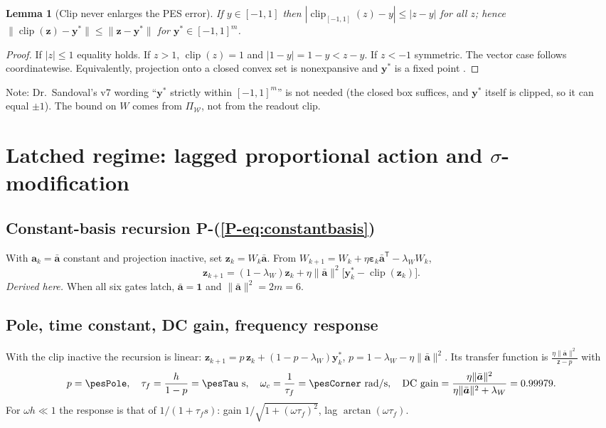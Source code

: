 \documentclass[11pt]{article}
\newcommand{\T}{^{\mathsf T}}
\newcommand{\clip}{\operatorname{clip}}
\newcommand{\PE}[1]{P-(\ref{P-#1})}          %
\newtheorem{lemma}{Lemma}
\theoremstyle{remark}
\begin{document}
\begin{lemma}[Clip never enlarges the PES error]\label{lem:clip}
If $y\in[-1,1]$ then $|\clip_{[-1,1]}(z)-y|\le|z-y|$ for all $z$; hence
$\|\clip(\bm z)-\bm y^*\|\le\|\bm z-\bm y^*\|$ for $\bm y^*\in[-1,1]^m$.
\end{lemma}
\begin{proof}
If $|z|\le1$ equality holds. If $z>1$, $\clip(z)=1$ and $|1-y|=1-y<z-y$. If $z<-1$ symmetric. The vector
case follows coordinatewise. Equivalently, projection onto a closed convex set is nonexpansive and
$\bm y^*$ is a fixed point \cite{bauschke2017convex}.
\end{proof}
Note: Dr.\ Sandoval's v7 wording ``$\bm y^*$ strictly within $[-1,1]^m$'' is not needed (the closed box
suffices, and $\bm y^*$ itself is clipped, so it can equal $\pm1$). The bound on $W$ comes from
$\Pi_{\mathcal W}$, not from the readout clip.

\section{Latched regime: lagged proportional action and $\sigma$-modification}\label{sec:latched}
\subsection{Constant-basis recursion \PE{eq:constantbasis}}
With $\bm a_k=\bar{\bm a}$ constant and projection inactive, set $\bm z_k=W_k\bar{\bm a}$. From
$W_{k+1}=W_k+\eta\bm\varepsilon_k\bar{\bm a}\T-\lambda_WW_k$,
\[
\bm z_{k+1}=(1-\lambda_W)\bm z_k+\eta\|\bar{\bm a}\|^2\big[\bm y_k^*-\clip(\bm z_k)\big].
\]
\emph{Derived here.} When all six gates latch, $\bar{\bm a}=\bm1$ and $\|\bar{\bm a}\|^2=2m=6$.

\subsection{Pole, time constant, DC gain, frequency response}
With the clip inactive the recursion is linear:
$\bm z_{k+1}=p\,\bm z_k+(1-p-\lambda_W)\bm y_k^*$, $p=1-\lambda_W-\eta\|\bar{\bm a}\|^2$. Its transfer function
is $\frac{\eta\|\bar{\bm a}\|^2}{\mathsf z-p}$ with
\[
p=\pesPole,\quad \tau_f=\frac{h}{1-p}=\pesTau\ \text{s},\quad
\omega_c=\frac1{\tau_f}=\pesCorner\ \text{rad/s},\quad
\text{DC gain}=\frac{\eta\|\bar{\bm a}\|^2}{\eta\|\bar{\bm a}\|^2+\lambda_W}=0.99979.
\]
For $\omega h\ll1$ the response is that of $1/(1+\tau_f s)$: gain $1/\sqrt{1+(\omega\tau_f)^2}$, lag
$\arctan(\omega\tau_f)$.
\end{document}
